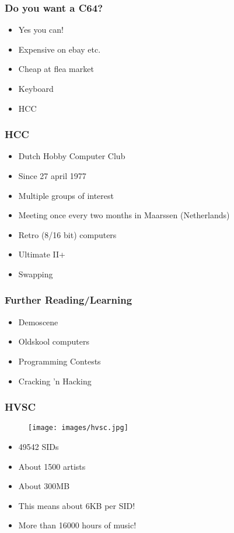 \documentclass[aspectratio=43]{uva-inf-presentation}
\begin{document}
\begin{frame}
\frametitle{Do you want a C64?}

\begin{itemize}
\item Yes you can!
\item Expensive on ebay etc.
\item Cheap at flea market
\item Keyboard
\item HCC
\end{itemize}

\end{frame}


\begin{frame}
\frametitle{HCC}

\begin{itemize}
\item Dutch Hobby Computer Club
\item Since 27 april 1977
\item Multiple groups of interest
\item Meeting once every two months in Maarssen (Netherlands)
\item Retro (8/16 bit) computers
\item Ultimate II+
\item Swapping
\end{itemize}

\end{frame}


\begin{frame}
\frametitle{Further Reading/Learning}

\begin{itemize}
\item Demoscene
\item Oldskool computers
\item Programming Contests
\item Cracking 'n Hacking
\end{itemize}

\end{frame}


\begin{frame}
\frametitle{HVSC}

\begin{figure}
\texttt{[image: images/hvsc.jpg]}
\end{figure}

\begin{itemize}
\item 49542 SIDs
\item About 1500 artists
\item About 300MB
\item This means about 6KB per SID!
\item More than 16000 hours of music!
\end{itemize}

\end{frame}
\end{document}
